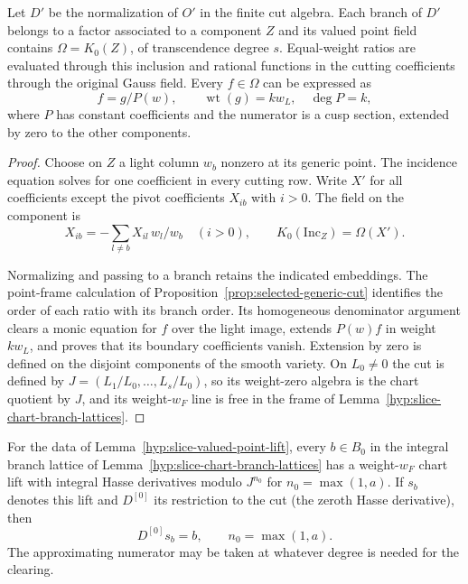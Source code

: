 \begin{established}
\label{hyp:slice-valued-point-lift}\label{cor:generic-slice-lifting-1}
Let \(D'\) be the normalization of \(O'\) in the finite cut algebra.
Each branch of \(D'\) belongs to a factor associated to a component
\(Z\) and its valued point field contains \(\Omega=K_0(Z)\), of
transcendence degree \(s\). Equal-weight ratios are evaluated through
this inclusion and rational functions in the cutting coefficients
through the original Gauss field. Every \(f\in\Omega\) can be expressed as
\[
       f=g/P(w),\qquad \operatorname{wt}(g)=k w_L,\quad \deg P=k,
\]
where \(P\) has constant coefficients and the numerator is a cusp
section, extended by zero to the other components.
\end{established}
\begin{proof}
Choose on \(Z\) a light column \(w_b\) nonzero at its generic point.
The incidence equation solves for one coefficient in every cutting
row. Write \(X'\) for all coefficients except the pivot coefficients
\(X_{ib}\) with \(i>0\). The field on the component is
\[
 X_{ib}=-\sum_{l\ne b} X_{il}\,w_l/w_b \quad (i>0),\qquad
 K_0(\mathrm{Inc}_Z)=\Omega(X').
\]

Normalizing and
passing to a branch retains the indicated embeddings. The point-frame
calculation of Proposition~\ref{prop:selected-generic-cut} identifies
the order of each ratio with its branch order. Its homogeneous
denominator argument clears a monic equation for \(f\) over the light
image, extends \(P(w)f\) in weight \(k w_L\), and proves that its boundary
coefficients vanish. Extension by zero is defined on the disjoint
components of the smooth variety. On \(L_0\ne0\) the cut is defined
by \(J=(L_1/L_0,\ldots,L_s/L_0)\), so its weight-zero algebra is the
chart quotient by \(J\), and its weight-\(w_F\) line is free in the
frame of Lemma~\ref{hyp:slice-chart-branch-lattices}.
\end{proof}

\begin{proposition}
\label{prop:generic-branch-jet-lift}
For the data of Lemma~\ref{hyp:slice-valued-point-lift}, every
\(b\in B_0\) in the integral branch lattice of
Lemma~\ref{hyp:slice-chart-branch-lattices} has a
weight-\(w_F\) chart lift with integral Hasse derivatives modulo \(J^{n_0}\)
for \(n_0=\max(1,a)\). If \(s_b\) denotes this lift and \(D^{[0]}\) its restriction to the cut (the zeroth Hasse derivative), then
\[
 D^{[0]}s_b=b,\qquad n_0=\max(1,a).
\]
 The approximating
numerator may be taken at whatever degree is needed for the clearing.
\end{proposition}

